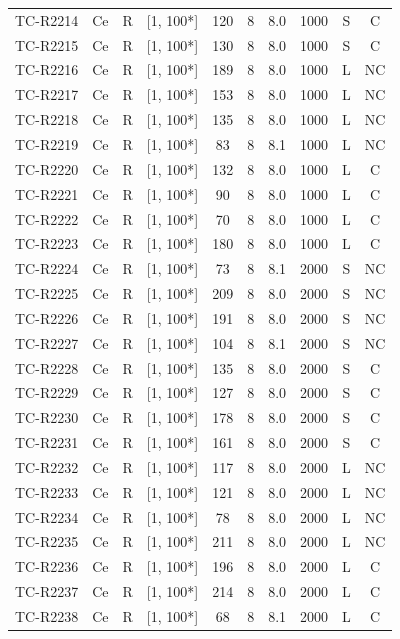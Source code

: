 \begin{longtable}{lccccccccc}
TC-R2214 & Ce & R & [1, 100*] & 120 & 8 & 8.0 & 1000 & S & C \\
TC-R2215 & Ce & R & [1, 100*] & 130 & 8 & 8.0 & 1000 & S & C \\
TC-R2216 & Ce & R & [1, 100*] & 189 & 8 & 8.0 & 1000 & L & NC \\
TC-R2217 & Ce & R & [1, 100*] & 153 & 8 & 8.0 & 1000 & L & NC \\
TC-R2218 & Ce & R & [1, 100*] & 135 & 8 & 8.0 & 1000 & L & NC \\
TC-R2219 & Ce & R & [1, 100*] & 83 & 8 & 8.1 & 1000 & L & NC \\
TC-R2220 & Ce & R & [1, 100*] & 132 & 8 & 8.0 & 1000 & L & C \\
TC-R2221 & Ce & R & [1, 100*] & 90 & 8 & 8.0 & 1000 & L & C \\
TC-R2222 & Ce & R & [1, 100*] & 70 & 8 & 8.0 & 1000 & L & C \\
TC-R2223 & Ce & R & [1, 100*] & 180 & 8 & 8.0 & 1000 & L & C \\
TC-R2224 & Ce & R & [1, 100*] & 73 & 8 & 8.1 & 2000 & S & NC \\
TC-R2225 & Ce & R & [1, 100*] & 209 & 8 & 8.0 & 2000 & S & NC \\
TC-R2226 & Ce & R & [1, 100*] & 191 & 8 & 8.0 & 2000 & S & NC \\
TC-R2227 & Ce & R & [1, 100*] & 104 & 8 & 8.1 & 2000 & S & NC \\
TC-R2228 & Ce & R & [1, 100*] & 135 & 8 & 8.0 & 2000 & S & C \\
TC-R2229 & Ce & R & [1, 100*] & 127 & 8 & 8.0 & 2000 & S & C \\
TC-R2230 & Ce & R & [1, 100*] & 178 & 8 & 8.0 & 2000 & S & C \\
TC-R2231 & Ce & R & [1, 100*] & 161 & 8 & 8.0 & 2000 & S & C \\
TC-R2232 & Ce & R & [1, 100*] & 117 & 8 & 8.0 & 2000 & L & NC \\
TC-R2233 & Ce & R & [1, 100*] & 121 & 8 & 8.0 & 2000 & L & NC \\
TC-R2234 & Ce & R & [1, 100*] & 78 & 8 & 8.0 & 2000 & L & NC \\
TC-R2235 & Ce & R & [1, 100*] & 211 & 8 & 8.0 & 2000 & L & NC \\
TC-R2236 & Ce & R & [1, 100*] & 196 & 8 & 8.0 & 2000 & L & C \\
TC-R2237 & Ce & R & [1, 100*] & 214 & 8 & 8.0 & 2000 & L & C \\
TC-R2238 & Ce & R & [1, 100*] & 68 & 8 & 8.1 & 2000 & L & C \\

\end{longtable}
